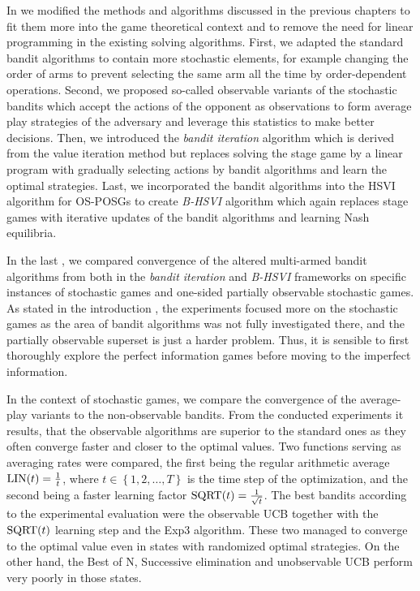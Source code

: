 \documentclass[../main.tex]{subfiles}
\begin{document}
In  we modified the methods and algorithms discussed in the previous chapters to fit them more into the game theoretical context and to remove the need for linear programming in the existing solving algorithms.
First, we adapted the standard bandit algorithms to contain more stochastic elements, for example changing the order of arms to prevent selecting the same arm all the time by order-dependent operations.
Second, we proposed so-called observable variants of the stochastic bandits which accept the actions of the opponent as observations to form average play strategies of the adversary and leverage this statistics to make better decisions.
Then, we introduced the \textit{bandit iteration} algorithm which is derived from the value iteration method but replaces solving the stage game by a linear program with gradually selecting actions by bandit algorithms and learn the optimal strategies.
Last, we incorporated the bandit algorithms into the HSVI algorithm for OS-POSGs to create \textit{B-HSVI} algorithm which again replaces stage games with iterative updates of the bandit algorithms and learning Nash equilibria.

In the last , we compared convergence of the altered multi-armed bandit algorithms from  both in the \textit{bandit iteration} and \textit{B-HSVI} frameworks on specific instances of stochastic games and one-sided partially observable stochastic games.
As stated in the introduction , the experiments focused more on the stochastic games as the area of bandit algorithms was not fully investigated there, and the partially observable superset is just a harder problem.
Thus, it is sensible to first thoroughly explore the perfect information games before moving to the imperfect information.

In the context of stochastic games, we compare the convergence of the average-play variants to the non-observable bandits.
From the conducted experiments it results, that the observable algorithms are superior to the standard ones as they often converge faster and closer to the optimal values.
Two functions serving as averaging rates were compared, the first being the regular arithmetic average $\text{LIN}(t) = \frac{1}{t}$, where $t \in \left\{1, 2, \dots, T\right\}$ is the time step of the optimization, and the second being a faster learning factor $\text{SQRT}(t) = \frac{1}{\sqrt{t}}$.
The best bandits according to the experimental evaluation were the observable UCB together with the $\text{SQRT}(t)$ learning step and the Exp3 algorithm.
These two managed to converge to the optimal value even in states with randomized optimal strategies.
On the other hand, the Best of N, Successive elimination and unobservable UCB perform very poorly in those states.
\end{document}
